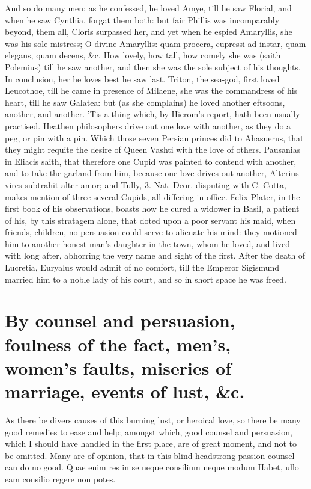 {And so do many men; as he confessed, he loved Amye, till he saw
Florial, and when he saw Cynthia, forgat them both: but fair Phillis
was incomparably beyond, them all, Cloris surpassed her, and yet when
he espied Amaryllis, she was his sole mistress; O divine Amaryllis:
quam procera, cupressi ad instar, quam elegans, quam decens, \&c. How
lovely, how tall, how comely she was (saith Polemius) till he saw
another, and then she was the sole subject of his thoughts. In
conclusion, her he loves best he saw last. Triton, the sea-god,
first loved Leucothoe, till he came in presence of Milaene, she was the
commandress of his heart, till he saw Galatea: but (as she
complains) he loved another eftsoons, another, and another. 'Tis a
thing which, by Hierom's report, hath been usually practised.
Heathen philosophers drive out one love with another, as they do
a peg, or pin with a pin. Which those seven Persian princes did to
Ahasuerus, that they might requite the desire of Queen Vashti with the
love of others. Pausanias in Eliacis saith, that therefore one Cupid
was painted to contend with another, and to take the garland from him,
because one love drives out another, Alterius vires subtrahit
alter amor; and Tully, 3. Nat. Deor. disputing with C. Cotta, makes
mention of three several Cupids, all differing in office. Felix Plater,
in the first book of his observations, boasts how he cured a widower in
Basil, a patient of his, by this stratagem alone, that doted upon a
poor servant his maid, when friends, children, no persuasion could
serve to alienate his mind: they motioned him to another honest man's
daughter in the town, whom he loved, and lived with long after,
abhorring the very name and sight of the first. After the death of
Lucretia, Euryalus would admit of no comfort, till the Emperor
Sigismund married him to a noble lady of his court, and so in short
space he was freed.

\section[Counsel and persuasion]{By counsel and persuasion, foulness of the fact, men's, women's faults, miseries of marriage, events of lust, \&c.}

As there be divers causes of this burning lust, or heroical love, so
there be many good remedies to ease and help; amongst which, good
counsel and persuasion, which I should have handled in the first place,
are of great moment, and not to be omitted. Many are of opinion, that
in this blind headstrong passion counsel can do no good.
Quae enim res in se neque consilium neque modum
Habet, ullo eam consilio regere non potes.

}
